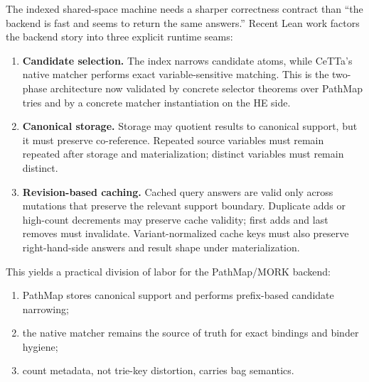\documentclass[11pt]{article}
\newcommand{\HE}{\textup{HE}}
\newcommand{\CeTTa}{\textup{CeTTa}}
\newcommand{\PathMap}{\textup{PathMap}}
\begin{document}
The indexed shared-space machine needs a sharper correctness contract than
``the backend is fast and seems to return the same answers.''  Recent Lean
work factors the backend story into three explicit runtime seams:
\begin{enumerate}
\item \textbf{Candidate selection.}
  The index narrows candidate atoms, while \CeTTa{}'s native matcher performs
  exact variable-sensitive matching.  This is the two-phase architecture now
  validated by concrete selector theorems over \PathMap{} tries and by a
  concrete matcher instantiation on the \HE{} side.
\item \textbf{Canonical storage.}
  Storage may quotient results to canonical support, but it must preserve
  co-reference.  Repeated source variables must remain repeated after storage
  and materialization; distinct variables must remain distinct.
\item \textbf{Revision-based caching.}
  Cached query answers are valid only across mutations that preserve the
  relevant support boundary.  Duplicate adds or high-count decrements may
  preserve cache validity; first adds and last removes must invalidate.
  Variant-normalized cache keys must also preserve right-hand-side answers and
  result shape under materialization.
\end{enumerate}

This yields a practical division of labor for the PathMap/MORK backend:
\begin{enumerate}
\item \PathMap{} stores canonical support and performs prefix-based candidate
  narrowing;
\item the native matcher remains the source of truth for exact bindings and
  binder hygiene;
\item count metadata, not trie-key distortion, carries bag semantics.
\end{enumerate}
\end{document}
